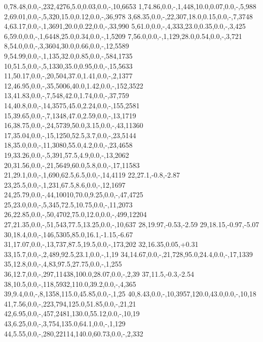   0,78.48,0.0,-,232,4276,5.0,0.03,0.0,-,10,6653
  1,74.86,0.0,-,1,448,10.0,0.07,0.0,-,5,988
  2,69.01,0.0,-,5,320,15.0,0.12,0.0,-,36,978
  3,68.35,0.0,-,22,307,18.0,0.15,0.0,-,7,3748
  4,63.17,0.0,-,1,3691,20.0,0.22,0.0,-,33,990
  5,61.0,0.0,-,4,333,23.0,0.35,0.0,-,3,425
  6,59.0,0.0,-,1,6448,25.0,0.34,0.0,-,1,5209
  7,56.0,0.0,-,1,129,28.0,0.54,0.0,-,3,721
  8,54.0,0.0,-,3,3604,30.0,0.66,0.0,-,12,5589
  9,54.99,0.0,-,1,135,32.0,0.85,0.0,-,584,1735
  10,51.5,0.0,-,5,1330,35.0,0.95,0.0,-,15,5633
  11,50.17,0.0,-,20,504,37.0,1.41,0.0,-,2,1377
  12,46.95,0.0,-,35,5006,40.0,1.42,0.0,-,152,3522
  13,41.83,0.0,-,7,548,42.0,1.74,0.0,-,37,759
  14,40.8,0.0,-,14,3575,45.0,2.24,0.0,-,155,2581
  15,39.65,0.0,-,7,1348,47.0,2.59,0.0,-,13,1719
  16,38.75,0.0,-,24,5739,50.0,3.15,0.0,-,43,11360
  17,35.04,0.0,-,15,1250,52.5,3.7,0.0,-,23,5144
  18,35.0,0.0,-,11,3080,55.0,4.2,0.0,-,23,4658
  19,33.26,0.0,-,5,391,57.5,4.9,0.0,-,13,2062
  20,31.56,0.0,-,21,5649,60.0,5.8,0.0,-,17,11583
  21,29.1,0.0,-,1,690,62.5,6.5,0.0,-,14,4119
  22,27.1,-0.8,-2.87%
  23,25.5,0.0,-,1,231,67.5,8.6,0.0,-,12,1697
  24,25.79,0.0,-,44,10010,70.0,9.25,0.0,-,47,4725
  25,23.0,0.0,-,5,345,72.5,10.75,0.0,-,11,2073
  26,22.85,0.0,-,50,4702,75.0,12.0,0.0,-,499,12204
  27,21.35,0.0,-,51,543,77.5,13.25,0.0,-,10,637
  28,19.97,-0.53,-2.59%
  29,18.15,-0.97,-5.07%
  30,18.4,0.0,-,146,5305,85.0,16.1,-1.15,-6.67%
  31,17.07,0.0,-,13,737,87.5,19.5,0.0,-,173,202
  32,16.35,0.05,+0.31%
  33,15.7,0.0,-,2,489,92.5,23.1,0.0,-,1,19
  34,14.67,0.0,-,21,728,95.0,24.4,0.0,-,17,1339
  35,12.8,0.0,-,4,83,97.5,27.75,0.0,-,1,255
  36,12.7,0.0,-,297,11438,100.0,28.07,0.0,-,2,39
  37,11.5,-0.3,-2.54%
  38,10.5,0.0,-,118,5932,110.0,39.2,0.0,-,4,365
  39,9.4,0.0,-,8,1358,115.0,45.85,0.0,-,1,25
  40,8.43,0.0,-,10,3957,120.0,43.0,0.0,-,10,18
  41,7.56,0.0,-,223,794,125.0,51.85,0.0,-,21,21
  42,6.95,0.0,-,457,2481,130.0,55.12,0.0,-,10,19
  43,6.25,0.0,-,3,754,135.0,64.1,0.0,-,1,129
  44,5.55,0.0,-,280,22114,140.0,60.73,0.0,-,2,332
 
